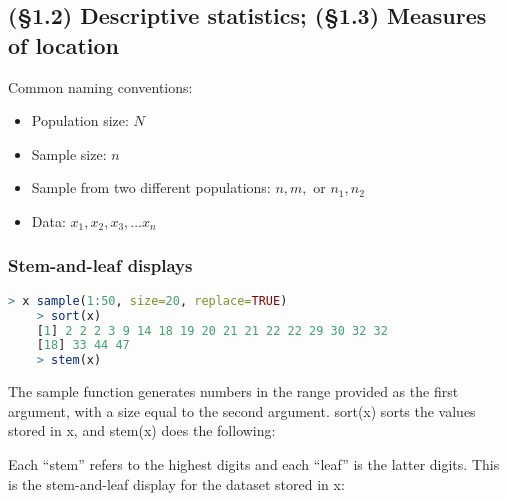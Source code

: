 \documentclass[../Notes.tex]{subfiles}
\begin{document}

     \subsection*{(\S 1.2) Descriptive statistics; (\S 1.3) Measures of location}

    Common naming conventions:
    \begin{itemize}
        \item Population size: $N$
        \item Sample size: $n$
        \item Sample from two different populations: $n, m,$ or $n_1, n_2$
        \item Data: $x_1, x_2, x_3, \dots x_n$
    \end{itemize}

    \subsubsection{Stem-and-leaf displays}

\begin{lstlisting}[language=R]
    > x sample(1:50, size=20, replace=TRUE)
    > sort(x)
    [1] 2 2 2 3 9 14 18 19 20 21 21 22 22 29 30 32 32
    [18] 33 44 47
    > stem(x)
\end{lstlisting}

    The sample function generates numbers in the range provided as the first argument, with a size equal to the second argument. sort(x) sorts the values stored in x, and stem(x) does the following:

    Each ``stem'' refers to the highest digits and each ``leaf'' is the latter digits. This is the stem-and-leaf display for the dataset stored in x:

    \begin{center}
    \end{center}
\end{document}
